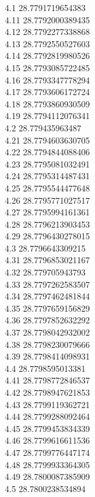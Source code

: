 {4.1	28.7791719654383\\
4.11	28.7792000389435\\
4.12	28.7792277338868\\
4.13	28.7792550527603\\
4.14	28.7792819980526\\
4.15	28.7793085722485\\
4.16	28.7793347778294\\
4.17	28.7793606172724\\
4.18	28.7793860930509\\
4.19	28.7794112076341\\
4.2	28.779435963487\\
4.21	28.7794603630705\\
4.22	28.7794844088406\\
4.23	28.7795081032491\\
4.24	28.7795314487431\\
4.25	28.7795544477648\\
4.26	28.7795771027517\\
4.27	28.7795994161361\\
4.28	28.7796213903453\\
4.29	28.7796430278015\\
4.3	28.7796643309215\\
4.31	28.7796853021167\\
4.32	28.779705943793\\
4.33	28.7797262583507\\
4.34	28.7797462481844\\
4.35	28.7797659156829\\
4.36	28.7797852632292\\
4.37	28.7798042932002\\
4.38	28.7798230079666\\
4.39	28.7798414098931\\
4.4	28.7798595013381\\
4.41	28.7798772846537\\
4.42	28.7798947621853\\
4.43	28.7799119362721\\
4.44	28.7799288092464\\
4.45	28.7799453834339\\
4.46	28.7799616611536\\
4.47	28.7799776447174\\
4.48	28.7799933364305\\
4.49	28.7800087385909\\
4.5	28.7800238534894\\
}
